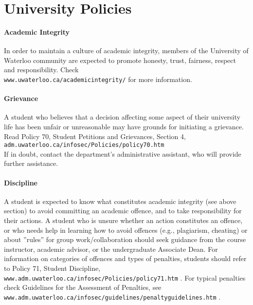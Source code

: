 \documentclass[letterpaper,10pt]{article}
\begin{document}


\section*{University Policies}

\paragraph{Academic Integrity}
In order to maintain a culture of academic integrity, members of the University of Waterloo community are expected to promote honesty, trust, fairness, respect and responsibility. Check\\
\texttt{www.uwaterloo.ca/academicintegrity/} for more information.

\paragraph{Grievance}
A student who believes that a decision affecting some aspect of their university life has been unfair or unreasonable may have grounds for initiating a grievance. Read Policy 70, Student Petitions and Grievances, Section 4, \texttt{adm.uwaterloo.ca/infosec/Policies/policy70.htm} \\
If in doubt, contact the department's administrative assistant, who will provide further assistance.

\paragraph{Discipline}
A student is expected to know what constitutes academic integrity (see above section) to avoid committing an academic offence, and to take responsibility for their actions. A student who is unsure whether an action constitutes an offence, or who needs help in learning how to avoid offences (e.g., plagiarism, cheating) or about ''rules'' for group work/collaboration should seek guidance from the course instructor, academic advisor, or the undergraduate Associate Dean. For information on categories of offences and types of penalties, students should refer to Policy 71, Student Discipline, \texttt{www.adm.uwaterloo.ca/infosec/Policies/policy71.htm} . For typical penalties check Guidelines for the Assessment of Penalties, see \\\texttt{www.adm.uwaterloo.ca/infosec/guidelines/penaltyguidelines.htm} .
\end{document}
